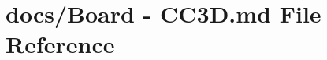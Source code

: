 \hypertarget{Board_01-_01CC3D_8md}{\section{docs/\+Board -\/ C\+C3\+D.\+md File Reference}
\label{Board_01-_01CC3D_8md}
}
